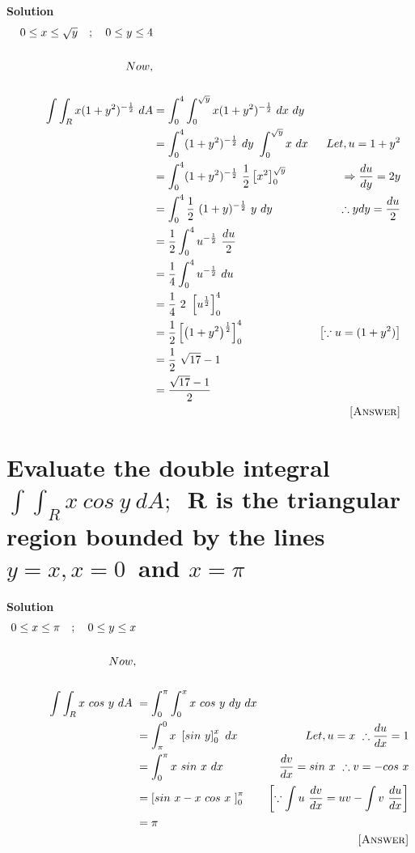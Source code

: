 \documentclass[12pt]{article}
\begin{document}
\textbf{Solution}
\begin{align*}
     0\leq x\leq\sqrt{y}\quad ;\quad 0\leq y\leq4\\\\
     Now,\\\\
     \int\int_{R}x(1+y^2)^{-\frac{1}{2}}\ dA &=\int_{0}^{4}\int_{0}^{\sqrt{y}}x(1+y^2)^{-\frac{1}{2}}\ dx\ dy\\
     &=\int_{0}^{4}(1+y^2)^{-\frac{1}{2}}\ dy\ \int_{0}^{\sqrt{y}}x\ dx & Let, u=1+y^2\\
     &=\int_{0}^{4}(1+y^2)^{-\frac{1}{2}}\ \frac{1}{2}\left[x^2\right]_{0}^{\sqrt{y}} & \Rightarrow \frac{du}{dy}=2y\\
     &=\int_{0}^{4}\frac{1}{2}\ (1+y)^{-\frac{1}{2}}\ y\ dy & \therefore ydy=\frac{du}{2}\\
     &=\frac{1}{2}\int_{0}^{4}u^{-\frac{1}{2}}\ \frac{du}{2}\\
     &=\frac{1}{4}\int_{0}^{4}u^{-\frac{1}{2}}\ du\\
     &=\frac{1}{4}\ 2\ \left[u^{\frac{1}{2}}\right]_{0}^{4}\\
     &=\frac{1}{2}\left[\left(1+y^2\right)^{\frac{1}{2}}\right]_{0}^{4} & \left[\because u=(1+y^2)\right]\\
     &=\frac{1}{2}\ \sqrt{17}-1\\
     &=\frac{\sqrt{17}-1}{2}\\
    & & \textsc{[Answer]}
\end{align*}
\pagebreak


\section{Evaluate the double integral $\int\int_{R}x\ cos\ y\ dA;$\ R is the triangular region bounded by the lines $y=x, x=0$\ and $x=\pi$}




\textbf{Solution}
\begin{align*}
    0\leq x\leq\pi\quad ;\quad 0\leq y\leq x\\\\
    Now,\\\\
    \int\int_{R}x\ cos\ y\ dA\ &=\int_{0}^{\pi}\int_{0}^{x}x\ cos\ y\ dy\ dx\\
    &=\int_{\pi}^{0}x\ \left[sin\ y\right]_{0}^{x}\ dx & Let, u=x\ \therefore \frac{du}{dx}=1\\
    &=\int_{0}^{\pi}x\ sin\ x\ dx & \frac{dv}{dx}=sin\ x\ \therefore v = -cos\ x\\
    &=\left[sin\ x - x\ cos\ x\ \right]_{0}^{\pi} & \left[\because\int u\ \frac{dv}{dx}=uv-\int v\ \frac{du}{dx}\right]\\
    &=\pi\\
    & & \textsc{[Answer]}
\end{align*}
\pagebreak
\end{document}
